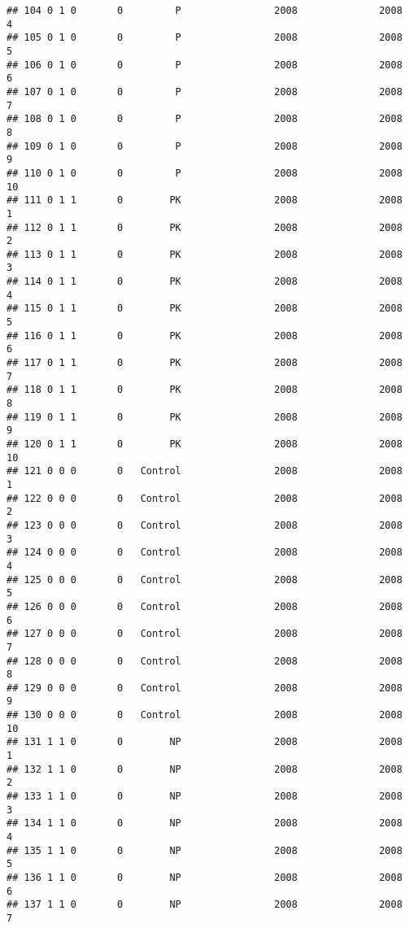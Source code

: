 \documentclass[]{article}
\begin{document}
\begin{verbatim}
## 104 0 1 0       0         P                2008              2008        4
## 105 0 1 0       0         P                2008              2008        5
## 106 0 1 0       0         P                2008              2008        6
## 107 0 1 0       0         P                2008              2008        7
## 108 0 1 0       0         P                2008              2008        8
## 109 0 1 0       0         P                2008              2008        9
## 110 0 1 0       0         P                2008              2008       10
## 111 0 1 1       0        PK                2008              2008        1
## 112 0 1 1       0        PK                2008              2008        2
## 113 0 1 1       0        PK                2008              2008        3
## 114 0 1 1       0        PK                2008              2008        4
## 115 0 1 1       0        PK                2008              2008        5
## 116 0 1 1       0        PK                2008              2008        6
## 117 0 1 1       0        PK                2008              2008        7
## 118 0 1 1       0        PK                2008              2008        8
## 119 0 1 1       0        PK                2008              2008        9
## 120 0 1 1       0        PK                2008              2008       10
## 121 0 0 0       0   Control                2008              2008        1
## 122 0 0 0       0   Control                2008              2008        2
## 123 0 0 0       0   Control                2008              2008        3
## 124 0 0 0       0   Control                2008              2008        4
## 125 0 0 0       0   Control                2008              2008        5
## 126 0 0 0       0   Control                2008              2008        6
## 127 0 0 0       0   Control                2008              2008        7
## 128 0 0 0       0   Control                2008              2008        8
## 129 0 0 0       0   Control                2008              2008        9
## 130 0 0 0       0   Control                2008              2008       10
## 131 1 1 0       0        NP                2008              2008        1
## 132 1 1 0       0        NP                2008              2008        2
## 133 1 1 0       0        NP                2008              2008        3
## 134 1 1 0       0        NP                2008              2008        4
## 135 1 1 0       0        NP                2008              2008        5
## 136 1 1 0       0        NP                2008              2008        6
## 137 1 1 0       0        NP                2008              2008        7

\end{verbatim}
\end{document}
